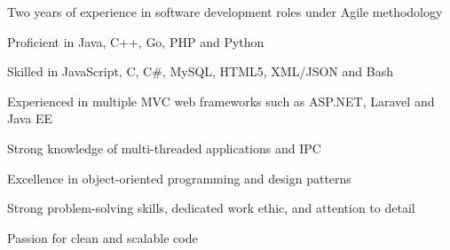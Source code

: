 

\begin{cvparagraph}

\begin{summaryitems}
    \item Two years of experience in software development roles under Agile methodology
    \item Proficient in Java, C++, Go, PHP and Python
    \item Skilled in JavaScript, C, C\#, MySQL, HTML5, XML/JSON and Bash
    \item Experienced in multiple MVC web frameworks such as ASP.NET, Laravel and Java EE
    \item Strong knowledge of multi-threaded applications and IPC
    \item Excellence in object-oriented programming and design patterns
    \item Strong problem-solving skills, dedicated work ethic, and attention to detail 
    \item Passion for clean and scalable code
\end{summaryitems}

\end{cvparagraph}